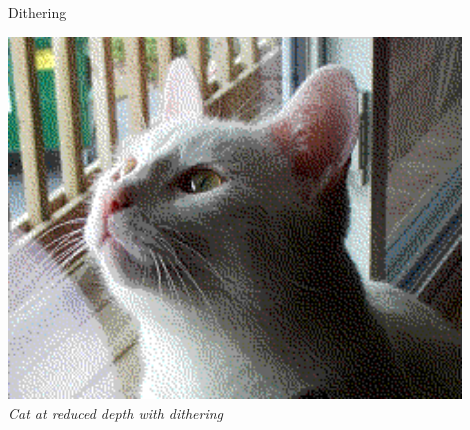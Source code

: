 \begin{frame}{Dithering}
\begin{minipage}[t]{0.25\textwidth}
    \includegraphics[width=0.9\textwidth]{slides/graphics-theory/cat-depth-dither.png}\\
    \textit{\small Cat at reduced depth with dithering}
  \end{minipage}
\end{frame}


